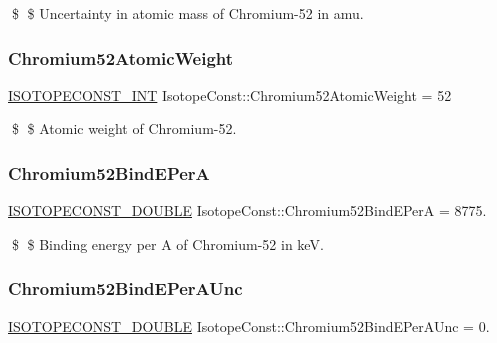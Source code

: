 \$ \$ Uncertainty in atomic mass of Chromium-\/52 in amu. \mbox{\label{group___isotope_const-_chromium-_cr52_ga67f6a2517353c0f87dae73e19a32bc8f}} 
\subsubsection{\texorpdfstring{Chromium52\+Atomic\+Weight}{Chromium52AtomicWeight}}
{\footnotesize\ttfamily \mbox{\hyperlink{group___isotope_const-_macros_ga5f18360b3e99483a35c32d789e62621c}{I\+S\+O\+T\+O\+P\+E\+C\+O\+N\+S\+T\+\_\+\+I\+NT}} Isotope\+Const\+::\+Chromium52\+Atomic\+Weight = 52}

\$ \$ Atomic weight of Chromium-\/52. \mbox{\label{group___isotope_const-_chromium-_cr52_gab367f8aeddb3a67e535e53a4ea13e638}} 
\subsubsection{\texorpdfstring{Chromium52\+Bind\+E\+PerA}{Chromium52BindEPerA}}
{\footnotesize\ttfamily \mbox{\hyperlink{group___isotope_const-_macros_ga8f45a7272ce02c0b4c65c44636ed719a}{I\+S\+O\+T\+O\+P\+E\+C\+O\+N\+S\+T\+\_\+\+D\+O\+U\+B\+LE}} Isotope\+Const\+::\+Chromium52\+Bind\+E\+PerA = 8775.}

\$ \$ Binding energy per A of Chromium-\/52 in keV. \mbox{\label{group___isotope_const-_chromium-_cr52_ga4c9f9a03355083f5dcc784a52089da26}} 
\subsubsection{\texorpdfstring{Chromium52\+Bind\+E\+Per\+A\+Unc}{Chromium52BindEPerAUnc}}
{\footnotesize\ttfamily \mbox{\hyperlink{group___isotope_const-_macros_ga8f45a7272ce02c0b4c65c44636ed719a}{I\+S\+O\+T\+O\+P\+E\+C\+O\+N\+S\+T\+\_\+\+D\+O\+U\+B\+LE}} Isotope\+Const\+::\+Chromium52\+Bind\+E\+Per\+A\+Unc = 0.}

